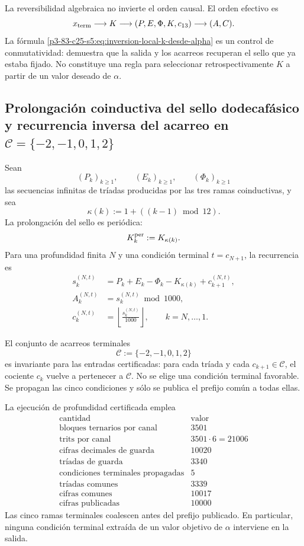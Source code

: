 La reversibilidad algebraica no invierte el orden causal. El orden efectivo
es
\[
 x_{\rm term}
 \longrightarrow K
 \longrightarrow(P,E,\Phi,K,c_{13})
 \longrightarrow(A,C).
\]
La fórmula \eqref{p3-83-c25-s5:eq:inversion-local-k-desde-alpha} es un control de
conmutatividad: demuestra que la salida y los acarreos recuperan el sello
que ya estaba fijado. No constituye una regla para seleccionar
retrospectivamente \(K\) a partir de un valor deseado de \(\alpha\).

\subsection{Prolongación coinductiva del sello dodecafásico y recurrencia inversa del acarreo en \(\mathcal C=\{-2,-1,0,1,2\}\)}

Sean
\[
 (P_k)_{k\geq1},
 \qquad
 (E_k)_{k\geq1},
 \qquad
 (\Phi_k)_{k\geq1}
\]
las secuencias infinitas de tríadas producidas por las tres ramas
coinductivas, y sea
\[
 \kappa(k):=1+((k-1)\bmod12).
\]
La prolongación del sello es periódica:
\[
 K_k^{\rm per}:=K_{\kappa(k)}.
\]
Para una profundidad finita \(N\) y una condición terminal
\(t=c_{N+1}\), la recurrencia es
\begin{equation}
\begin{aligned}
 s_k^{(N,t)}
 &=P_k+E_k-\Phi_k-K_{\kappa(k)}+c_{k+1}^{(N,t)},\\
 A_k^{(N,t)}
 &=s_k^{(N,t)}\bmod1000,\\
 c_k^{(N,t)}
 &=\left\lfloor\frac{s_k^{(N,t)}}{1000}\right\rfloor,
 \qquad k=N,\ldots,1.
\end{aligned}
\label{p3-83-c25-s5:eq:recurrencia-larga-alpha}
\end{equation}

El conjunto de acarreos terminales
\[
 \mathcal C:=\{-2,-1,0,1,2\}
\]
es invariante para las entradas certificadas: para cada tríada y cada
\(c_{k+1}\in\mathcal C\), el cociente \(c_k\) vuelve a pertenecer a
\(\mathcal C\). No se elige una condición terminal favorable. Se propagan
las cinco condiciones y sólo se publica el prefijo común a todas ellas.

La ejecución de profundidad certificada emplea
\[
\begin{array}{c|r}
\text{cantidad}&\text{valor}\\ \hline
\text{bloques ternarios por canal}&3501\\
\text{trits por canal}&3501\cdot6=21006\\
\text{cifras decimales de guarda}&10020\\
\text{tríadas de guarda}&3340\\
\text{condiciones terminales propagadas}&5\\
\text{tríadas comunes}&3339\\
\text{cifras comunes}&10017\\
\text{cifras publicadas}&10000
\end{array}
\]
Las cinco ramas terminales coalescen antes del prefijo publicado. En
particular, ninguna condición terminal extraída de un valor objetivo de
\(\alpha\) interviene en la salida.

